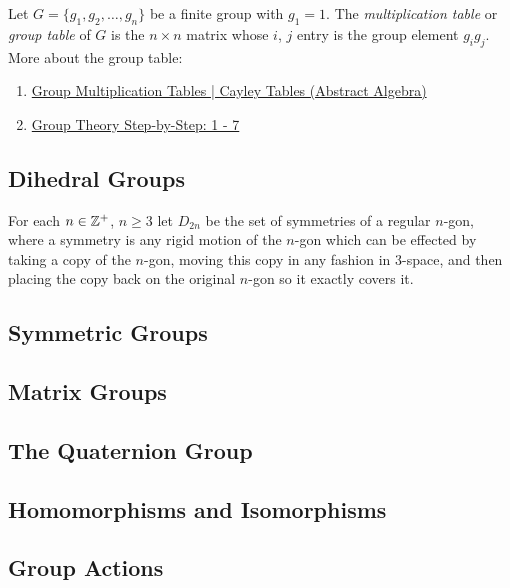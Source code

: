 {Let $G=\{g_{1},g_{2},\dots,g_{n}\}$ be a finite group with $g_{1} = 1$.
The {\sl multiplication table} or {\sl group table} of $G$ is the $n\times n$ matrix
whose $i$, $j$ entry is the group element $g_{i}g_{j}$.
}
More about the group table:
\begin{enumerate}[leftmargin=20pt, itemsep=0pt, topsep=0pt]
    \item \href{https://youtu.be/BwHspSCXFNM?si=1ucTvpLN6bGUYX9v}{Group Multiplication Tables | Cayley Tables (Abstract Algebra)}
    \item \href{https://youtu.be/tGCqP2ytP14?si=3P4tafGvrpjJWQyd}{Group Theory Step-by-Step: 1 - 7}
\end{enumerate}

\newpage
\thispagestyle{evenpagestyle}
\subsection{Dihedral Groups}
For each $n\in \mathbb{Z}^{+}$, $n\ge 3$ let $D_{2n}$ be the set of symmetries
of a regular $n$-gon, where a symmetry is any rigid motion of the $n$-gon which can
be effected by taking a copy of the $n$-gon, moving this copy in any fashion in $3$-space,
and then placing the copy back on the original $n$-gon so it exactly covers it.




\subsection{Symmetric Groups}









\subsection{Matrix Groups}









\subsection{The Quaternion Group}









\subsection{Homomorphisms and Isomorphisms}









\subsection{Group Actions}








